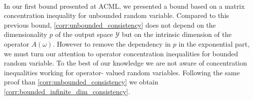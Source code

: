 \documentclass[twoside,11pt]{article}
\begin{document}
\paragraph{}
In our first bound presented at \acs{ACML}, we presented a bound based on a
matrix concentration inequality for unbounded random variable. Compared to this
previous bound, \cref{corr:unbounded_consistency} does not depend on the
dimensionality $p$ of the output space $\mathcal{Y}$ but on the intrinsic
dimension of the operator $A(\omega)$. However to remove the dependency in $p$
in the exponential part, we must turn our attention to operator concentration
inequalities for bounded random variable. To the best of our knowledge we are
not aware of concentration inequalities working for  operator-
valued random variables. Following the same proof than
\cref{corr:unbounded_consistency} we obtain
\cref{corr:bounded_infinite_dim_consistency}.
\end{document}
